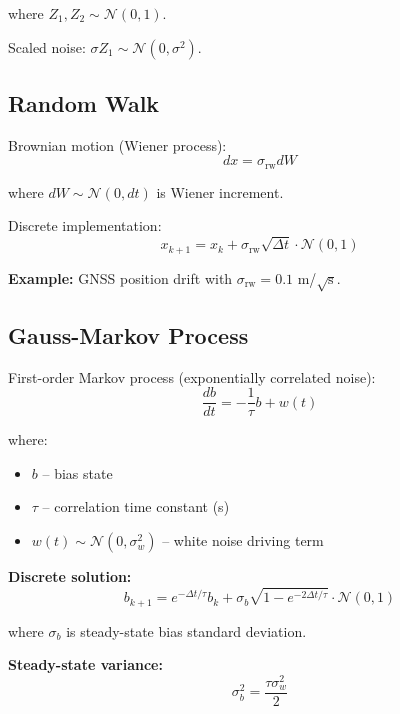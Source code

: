 \documentclass[11pt,a4paper]{article}
\begin{document}
where $Z_1, Z_2 \sim \mathcal{N}(0, 1)$.

Scaled noise: $\sigma Z_1 \sim \mathcal{N}(0, \sigma^2)$.

\subsection{Random Walk}

Brownian motion (Wiener process):
\begin{equation}
dx = \sigma_{\text{rw}} dW
\end{equation}

where $dW \sim \mathcal{N}(0, dt)$ is Wiener increment.

Discrete implementation:
\begin{equation}
x_{k+1} = x_k + \sigma_{\text{rw}} \sqrt{\Delta t} \cdot \mathcal{N}(0, 1)
\end{equation}

\textbf{Example:} GNSS position drift with $\sigma_{\text{rw}} = 0.1$ m/$\sqrt{\text{s}}$.

\subsection{Gauss-Markov Process}

First-order Markov process (exponentially correlated noise):
\begin{equation}
\frac{db}{dt} = -\frac{1}{\tau} b + w(t)
\end{equation}

where:
\begin{itemize}
    \item $b$ -- bias state
    \item $\tau$ -- correlation time constant (s)
    \item $w(t) \sim \mathcal{N}(0, \sigma_w^2)$ -- white noise driving term
\end{itemize}

\textbf{Discrete solution:}
\begin{equation}
b_{k+1} = e^{-\Delta t / \tau} b_k + \sigma_b \sqrt{1 - e^{-2\Delta t / \tau}} \cdot \mathcal{N}(0, 1)
\end{equation}

where $\sigma_b$ is steady-state bias standard deviation.

\textbf{Steady-state variance:}
\begin{equation}
\sigma_b^2 = \frac{\tau \sigma_w^2}{2}
\end{equation}
\end{document}
